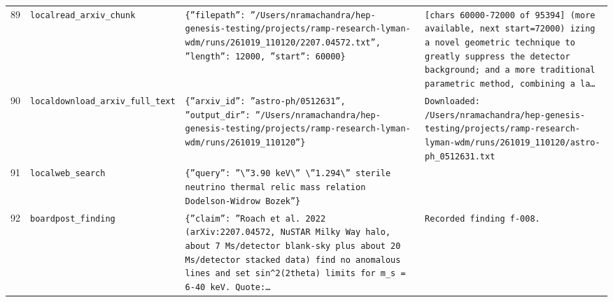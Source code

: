 \documentclass[11pt,a4paper]{article}
\begin{document}
\begin{longtable}{@{}p{}p{}p{}p{}@{}}
89 & \texttt{local}\newline\texttt{read\_\allowbreak{}arxiv\_\allowbreak{}chunk} & \texttt{\{''filepath'':\allowbreak{} ''/\allowbreak{}Users/\allowbreak{}nramachandra/\allowbreak{}hep-genesis-testing/\allowbreak{}projects/\allowbreak{}ramp-research-lyman-wdm/\allowbreak{}runs/\allowbreak{}261019\_\allowbreak{}110120/\allowbreak{}2207.04572.txt'',\allowbreak{} ''length'':\allowbreak{} 12000,\allowbreak{} ''start'':\allowbreak{} 60000\}\allowbreak{}} & \texttt{[chars 60000-72000 of 95394]\allowbreak{} (more available,\allowbreak{} next start=\allowbreak{}72000)\allowbreak{}  izing a novel geometric technique to greatly suppress the detector background;\allowbreak{} and a more traditional parametric method,\allowbreak{} combining a la\ldots{}\allowbreak{}} \\
90 & \texttt{local}\newline\texttt{download\_\allowbreak{}arxiv\_\allowbreak{}full\_\allowbreak{}text} & \texttt{\{''arxiv\_\allowbreak{}id'':\allowbreak{} ''astro-ph/\allowbreak{}0512631'',\allowbreak{} ''output\_\allowbreak{}dir'':\allowbreak{} ''/\allowbreak{}Users/\allowbreak{}nramachandra/\allowbreak{}hep-genesis-testing/\allowbreak{}projects/\allowbreak{}ramp-research-lyman-wdm/\allowbreak{}runs/\allowbreak{}261019\_\allowbreak{}110120''\}\allowbreak{}} & \texttt{Downloaded:\allowbreak{} /\allowbreak{}Users/\allowbreak{}nramachandra/\allowbreak{}hep-genesis-testing/\allowbreak{}projects/\allowbreak{}ramp-research-lyman-wdm/\allowbreak{}runs/\allowbreak{}261019\_\allowbreak{}110120/\allowbreak{}astro-ph\_\allowbreak{}0512631.txt} \\
91 & \texttt{local}\newline\texttt{web\_\allowbreak{}search} & \texttt{\{''query'':\allowbreak{} ''\textbackslash{}\allowbreak{}''3.90 keV\textbackslash{}\allowbreak{}'' \textbackslash{}\allowbreak{}''1.294\textbackslash{}\allowbreak{}'' sterile neutrino thermal relic mass relation Dodelson-Widrow Bozek''\}\allowbreak{}} & \texttt{} \\
92 & \texttt{board}\newline\texttt{post\_\allowbreak{}finding} & \texttt{\{''claim'':\allowbreak{} ''Roach et al. 2022 (arXiv:\allowbreak{}2207.04572,\allowbreak{} NuSTAR Milky Way halo,\allowbreak{} about 7 Ms/\allowbreak{}detector blank-sky plus about 20 Ms/\allowbreak{}detector stacked data)\allowbreak{} find no anomalous lines and set sin\textasciicircum{}\allowbreak{}2(2theta)\allowbreak{} limits for m\_\allowbreak{}s =\allowbreak{} 6-40 keV. Quote:\allowbreak{}\ldots{}\allowbreak{}} & \texttt{Recorded finding f-008.} \\

\end{longtable}
\end{document}
